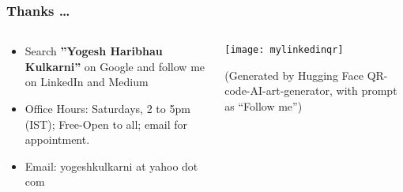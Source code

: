 \begin{frame}[fragile]\frametitle{Thanks \ldots}
\begin{columns}
    \begin{column}[T]{0.6\linewidth}
		\begin{itemize}
		\item Search {\Large \bf ''Yogesh Haribhau Kulkarni''} on Google and follow me on LinkedIn and Medium
		\item Office Hours: Saturdays, 2 to 5pm (IST); Free-Open to all; email for appointment.
		\item Email: yogeshkulkarni at yahoo dot com
		\end{itemize}
    \end{column}
    \begin{column}[T]{0.4\linewidth}
		\begin{center}
		\texttt{[image: mylinkedinqr]}
		\end{center}	
		
		{\tiny (Generated by Hugging Face QR-code-AI-art-generator, with prompt as ``Follow me'')}
    \end{column}
  \end{columns}
\end{frame}